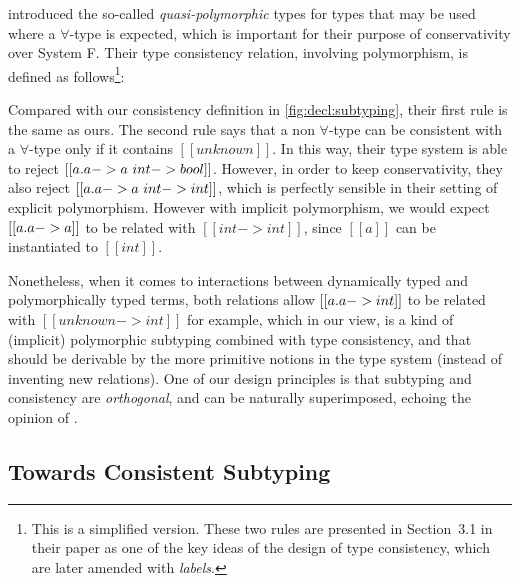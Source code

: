 \citet{yuu2017poly} introduced the so-called \emph{quasi-polymorphic} types
for types that may be used where a $\forall$-type is expected, which is
important for their purpose of conservativity over System F. Their type
consistency relation, involving polymorphism, is defined as
follows\footnote{This is a simplified version. These two rules are presented in
  Section~3.1 in their paper as one of the key ideas of the design of type
  consistency, which are later amended with \emph{labels}.}:
Compared with our consistency definition in \cref{fig:decl:subtyping},
their first rule is the same as ours. The second rule says that a non
$\forall$-type can be consistent with a $\forall$-type only if it contains
$[[unknown]]$. In this way, their type system is able to reject $[[ \/a . a -> a ~ int -> bool  ]]$.
However, in order to keep conservativity, they also reject
$[[  \/a. a -> a ~ int -> int ]]$, which is perfectly sensible in their
setting of explicit polymorphism. However with implicit polymorphism, we
would expect $[[ \/a. a -> a  ]]$ to be related with $[[int -> int]]$,
since $[[a]]$ can be instantiated to $[[int]]$.

Nonetheless, when it comes to interactions between dynamically typed and
polymorphically typed terms, both relations allow $[[ \/a. a -> int  ]]$
to be related with $[[ unknown -> int ]]$ for example, which in our view, is a kind of
(implicit) polymorphic subtyping combined with type consistency, and
that should be derivable by the more primitive notions in the type system
(instead of inventing new relations). One of our design principles is that
subtyping and consistency are \emph{orthogonal}, and can be naturally
superimposed, echoing the opinion of \citet{siek2007gradual}.

\subsection{Towards Consistent Subtyping}
\label{subsec:towards-conssub}

